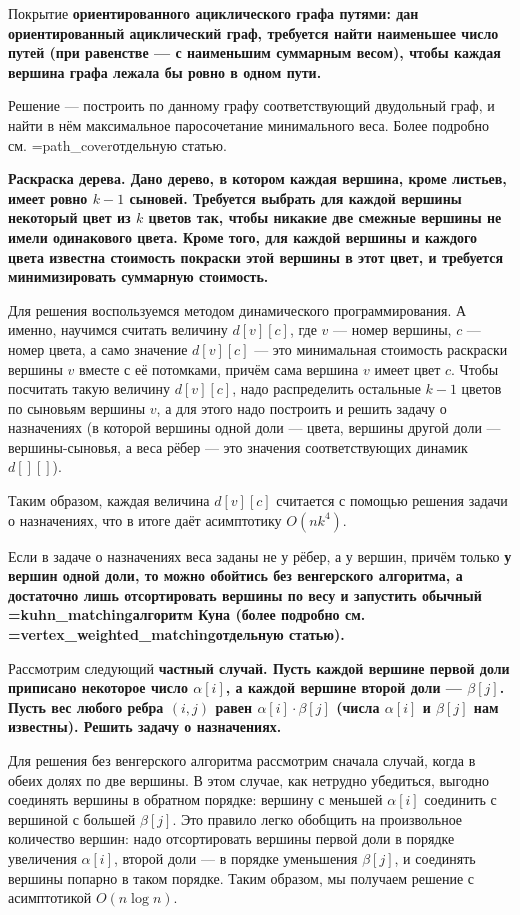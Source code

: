 {\li Покрытие \bf{ориентированного ациклического графа путями}: дан ориентированный ациклический граф, требуется найти наименьшее число путей (при равенстве --- с наименьшим суммарным весом), чтобы каждая вершина графа лежала бы ровно в одном пути.

Решение --- построить по данному графу соответствующий двудольный граф, и найти в нём максимальное паросочетание минимального веса. Более подробно см. \algohref=path_cover{отдельную статью}.

\li \bf{Раскраска дерева}. Дано дерево, в котором каждая вершина, кроме листьев, имеет ровно $k-1$ сыновей. Требуется выбрать для каждой вершины некоторый цвет из $k$ цветов так, чтобы никакие две смежные вершины не имели одинакового цвета. Кроме того, для каждой вершины и каждого цвета известна стоимость покраски этой вершины в этот цвет, и требуется минимизировать суммарную стоимость.

Для решения воспользуемся методом динамического программирования. А именно, научимся считать величину $d[v][c]$, где $v$ --- номер вершины, $c$ --- номер цвета, а само значение $d[v][c]$ --- это минимальная стоимость раскраски вершины $v$ вместе с её потомками, причём сама вершина $v$ имеет цвет $c$. Чтобы посчитать такую величину $d[v][c]$, надо распределить остальные $k-1$ цветов по сыновьям вершины $v$, а для этого надо построить и решить задачу о назначениях (в которой вершины одной доли --- цвета, вершины другой доли --- вершины-сыновья, а веса рёбер --- это значения соответствующих динамик $d[][]$).

Таким образом, каждая величина $d[v][c]$ считается с помощью решения задачи о назначениях, что в итоге даёт асимптотику $O(n k^4)$.

\li Если в задаче о назначениях веса заданы не у рёбер, а у вершин, причём только \bf{у вершин одной доли}, то можно обойтись без венгерского алгоритма, а достаточно лишь отсортировать вершины по весу и запустить обычный \algohref=kuhn_matching{алгоритм Куна} (более подробно см. \algohref=vertex_weighted_matching{отдельную статью}).

\li Рассмотрим следующий \bf{частный случай}. Пусть каждой вершине первой доли приписано некоторое число $\alpha[i]$, а каждой вершине второй доли --- $\beta[j]$. Пусть вес любого ребра $(i,j)$ равен $\alpha[i] \cdot \beta[j]$ (числа $\alpha[i]$ и $\beta[j]$ нам известны). Решить задачу о назначениях.

Для решения без венгерского алгоритма рассмотрим сначала случай, когда в обеих долях по две вершины. В этом случае, как нетрудно убедиться, выгодно соединять вершины в обратном порядке: вершину с меньшей $\alpha[i]$ соединить с вершиной с большей $\beta[j]$. Это правило легко обобщить на произвольное количество вершин: надо отсортировать вершины первой доли в порядке увеличения $\alpha[i]$, второй доли --- в порядке уменьшения $\beta[j]$, и соединять вершины попарно в таком порядке. Таким образом, мы получаем решение с асимптотикой $O (n \log n)$.

}

